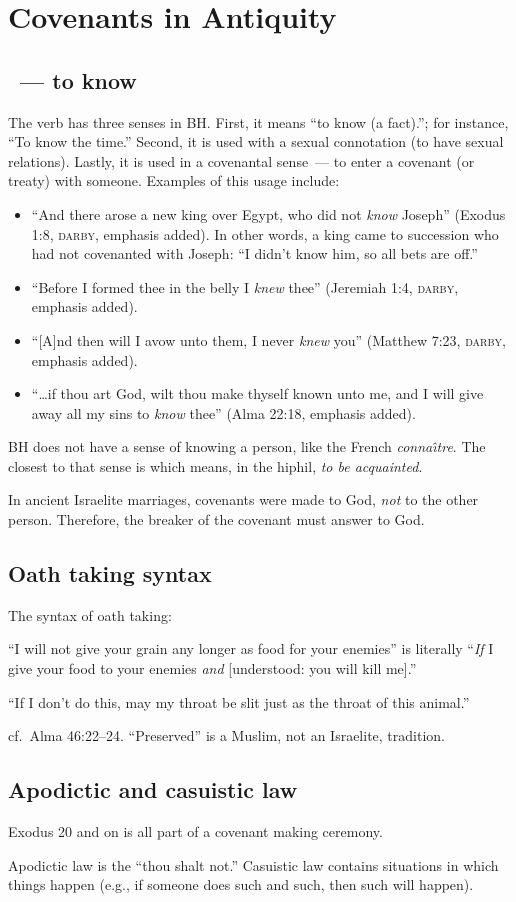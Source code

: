 \section{Covenants in Antiquity}\label{app:covenants-in-antiquity}\thispagestyle{fancy}
\subsection{~--- to know}
The verb  has three senses in BH. First, it means ``to know (a fact).''; for instance, ``To know the time.'' Second, it is used with a sexual connotation (to have sexual relations). Lastly, it is used in a covenantal sense~--- to enter a covenant (or treaty) with someone. Examples of this usage include:
\begin{itemize}
    \item ``And there arose a new king over Egypt, who did not \emph{know} Joseph'' (Exodus 1:8, \textsc{darby}, emphasis added). In other words, a king came to succession who had not covenanted with Joseph: ``I didn't know him, so all bets are off.''
    \item ``Before I formed thee in the belly I \emph{knew} thee'' (Jeremiah 1:4, \textsc{darby}, emphasis added).
    \item ``[A]nd then will I avow unto them, I never \emph{knew} you'' (Matthew 7:23, \textsc{darby}, emphasis added).
    \item ``\dots if thou art God, wilt thou make thyself known unto me, and I will give away all my sins to \emph{know} thee'' (Alma 22:18, emphasis added).
\end{itemize}

BH does not have a sense of knowing a person, like the French \emph{conna\^\i tre}. The closest to that sense is  which means, in the hiphil, \emph{to be acquainted}.

In ancient Israelite marriages, covenants were made to God, \emph{not} to the other person. Therefore, the breaker of the covenant must answer to God.

\subsection{Oath taking syntax}
The syntax of oath taking:

``I will not give your grain any longer as food for your enemies'' is literally ``\emph{If} I give your food to your enemies \emph{and} [understood: you will kill me].''

``If I don't do this, may my throat be slit just as the throat of this animal.''

cf.\ Alma 46:22--24. ``Preserved'' is a Muslim, not an Israelite, tradition.

\subsection{Apodictic and casuistic law}
Exodus 20 and on is all part of a covenant making ceremony.

Apodictic law is the ``thou shalt not.'' Casuistic law contains situations in which things happen (e.g., if someone does such and such, then such will happen).
